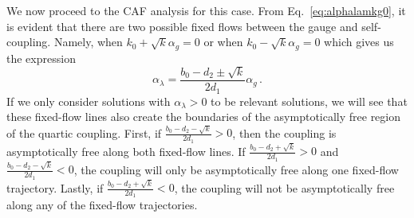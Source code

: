 We now proceed to the CAF analysis for this case. From Eq.~\eqref{eq:alphalamkg0}, it is evident that there are two possible fixed flows between the gauge and self-coupling. Namely, when $k_0+\sqrt{k}\alpha_g=0$ or when $k_0-\sqrt{k}\alpha_g=0$ which gives us the expression
\begin{equation}
    \alpha_\lambda =\frac{b_0-d_2\pm\sqrt{k}}{2d_1}\alpha_g\,.\label{eq:lamgfixed}
\end{equation}
If we only consider solutions with $\alpha_\lambda>0$ to be relevant solutions, we will see that these fixed-flow lines also create the boundaries of the asymptotically free region of the quartic coupling. First, if $\frac{b_0-d_2-\sqrt{k}}{2d_1}>0$, then the coupling is asymptotically free along both fixed-flow lines. If $\frac{b_0-d_2+\sqrt{k}}{2d_1}>0$ and $\frac{b_0-d_2-\sqrt{k}}{2d_1}<0$, the coupling will only be asymptotically free along one fixed-flow trajectory. Lastly, if $\frac{b_0-d_2+\sqrt{k}}{2d_1}<0$, the coupling will not be asymptotically free along any of the fixed-flow trajectories. 

